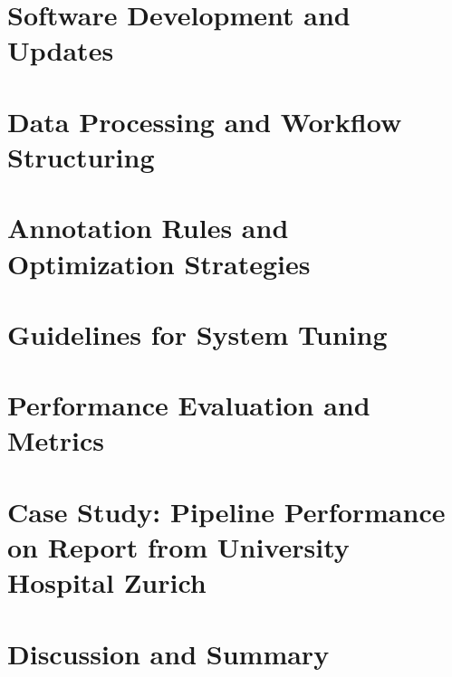 \documentclass[10pt,a4]{article}
\begin{document}
\section{Software Development and Updates}


\section{Data Processing and Workflow Structuring}


\section{Annotation Rules and Optimization Strategies}


\section{Guidelines for System Tuning}


\section{Performance Evaluation and Metrics}


\section{Case Study: Pipeline Performance on Report from University Hospital Zurich}


\section{Discussion and Summary}

\end{document}

